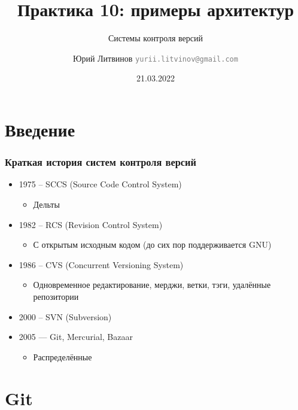 \documentclass[xetex,mathserif,serif]{beamer}
\title{Практика 10: примеры архитектур}
\subtitle{Системы контроля версий}
\author[Юрий Литвинов]{Юрий Литвинов \newline \textcolor{gray}{\small\texttt{yurii.litvinov@gmail.com}}}
\date{21.03.2022}
\begin{document}
    
\frame{\titlepage}

    \section{Введение}

    \begin{frame}
        \frametitle{Краткая история систем контроля версий}
        \begin{itemize}
            \item 1975 -- SCCS (Source Code Control System)
            \begin{itemize}
                \item Дельты
            \end{itemize}
            \item 1982 -- RCS (Revision Control System)
            \begin{itemize}
                \item С открытым исходным кодом (до сих пор поддерживается GNU)
            \end{itemize}
            \item 1986 -- CVS (Concurrent Versioning System)
            \begin{itemize}
                \item Одновременное редактирование, мерджи, ветки, тэги, удалённые репозитории
            \end{itemize}
            \item 2000 -- SVN (Subversion)
            \item 2005 --- Git, Mercurial, Bazaar
            \begin{itemize}
                \item Распределённые
            \end{itemize}
        \end{itemize}
    \end{frame}

    \section{Git}
\end{document}
